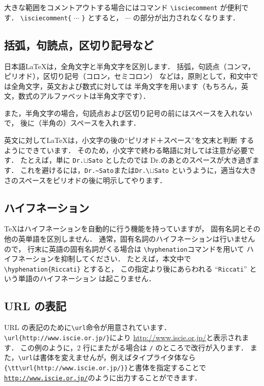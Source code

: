 \documentclass[J]{scitrans}
\begin{document}
大きな範囲をコメントアウトする場合にはコマンド
\verb+\isciecomment+ が便利です．
\verb+\isciecomment{+ $\cdots$ \verb+}+ とすると，
$\cdots$ の部分が出力されなくなります．
%
%

\subsection{括弧，句読点，区切り記号など} 
\label{subsec:punctuation}

日本語\LaTeX は，全角文字と半角文字を区別します．
括弧，句読点（コンマ，ピリオド），区切り記号（コロン，セミコロン）
などは，原則として，和文中では全角文字，英文および数式に対しては
半角文字を用います（もちろん，英文，数式のアルファベットは半角文字です）．

また，半角文字の場合，句読点および区切り記号の前にはスペースを入れないで，
後に（半角の）スペースを入れます．

英文に対して\LaTeX は，小文字の後の``ピリオド＋スペース''を文末と判断
するようにできています．
そのため，小文字で終わる略語に対しては注意が必要です．
たとえば，単に \verb+Dr.+$\sqcup$\verb+Sato+ としたのでは
Dr.のあとのスペースが大き過ぎます．
これを避けるには，\verb+Dr.~Sato+または\verb+Dr.\+$\sqcup$\verb+Sato+
というように，適当な大きさのスペースをピリオドの後に明示してやります．

\subsection{ハイフネーション} 
\label{subsec;hyphenation}

\TeX はハイフネーションを自動的に行う機能を持っていますが，
固有名詞とその他の英単語を区別しません．
通常，固有名詞のハイフネーションは行いませんので，
行末に英語の固有名詞がくる場合は
\verb+\hyphenation+コマンドを用いて
ハイフネーションを抑制してください．
たとえば，本文中で \verb+\hyphenation{Riccati}+ とすると，
この指定より後にあらわれる ``{\tt Riccati}'' という単語のハイフネーション
は起こりません．

\subsection{URL の表記}
\label{subsec;url}

URL の表記のために\verb+\url+命令が用意されています．
\verb+\url{http://www.iscie.or.jp/}+により
\url{http://www.iscie.or.jp/}と表示されます．
この例のように，2 行にまたがる場合は \verb+/+ のところで改行が入ります．
また，\verb+\url+は書体を変えませんが，例えばタイプライタ体なら
\verb+{\tt\url{http://www.iscie.or.jp/}}+と書体を指定することで
{\tt\url{http://www.iscie.or.jp/}}のように出力することができます．
\end{document}
